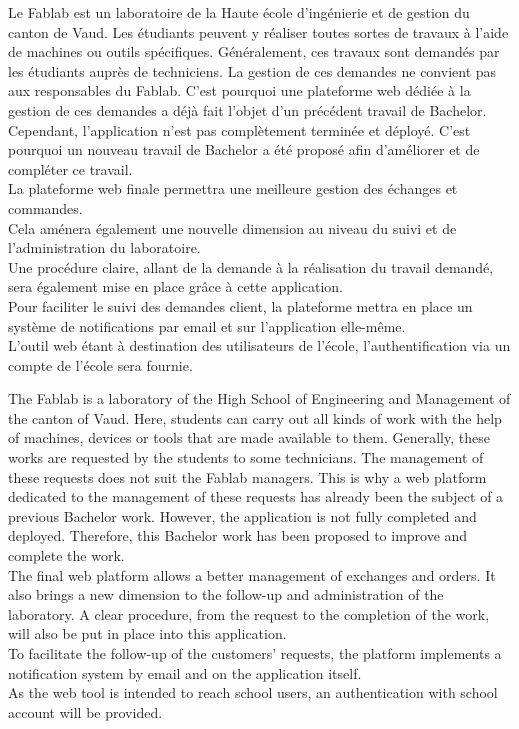 Le Fablab est un laboratoire de la Haute école d'ingénierie et de gestion du canton de Vaud.
Les étudiants peuvent y réaliser toutes sortes de travaux à l'aide de machines ou outils spécifiques. Généralement, ces travaux sont demandés par les étudiants auprès de techniciens.
La gestion de ces demandes ne convient pas aux responsables du Fablab. C'est pourquoi une plateforme web dédiée à la gestion de ces demandes a déjà fait l'objet d'un précédent travail de Bachelor.
Cependant, l'application n'est pas complètement terminée et déployé. C'est pourquoi un nouveau travail de Bachelor a été proposé afin d'améliorer et de compléter ce travail.\\
La plateforme web finale permettra une meilleure gestion des échanges et commandes.\\
Cela aménera également une nouvelle dimension au niveau du suivi et de l'administration du laboratoire.\\
Une procédure claire, allant de la demande à la réalisation du travail demandé, sera également mise en place grâce à cette application.\\
Pour faciliter le suivi des demandes client, la plateforme mettra en place un système de notifications par email et sur l'application elle-même.\\
L'outil web étant à destination des utilisateurs de l'école, l'authentification via un compte de l'école sera fournie.\\

\asterism

The Fablab is a laboratory of the High School of Engineering and Management of the canton of Vaud.
Here, students can carry out all kinds of work with the help of machines, devices or tools that are made available to them. Generally, these works are requested by the students to some technicians.
The management of these requests does not suit the Fablab managers.
This is why a web platform dedicated to the management of these requests has already been the subject of a previous Bachelor work. However, the application is not fully completed and deployed. Therefore, this Bachelor work has been proposed to improve and complete the work. \\
The final web platform allows a better management of exchanges and orders.
It also brings a new dimension to the follow-up and administration of the laboratory.
A clear procedure, from the request to the completion of the work, will also be put in place into this application. \\
To facilitate the follow-up of the customers' requests, the platform implements a notification system by email and on the application itself. \\
As the web tool is intended to reach school users, an authentication with school account will be provided.